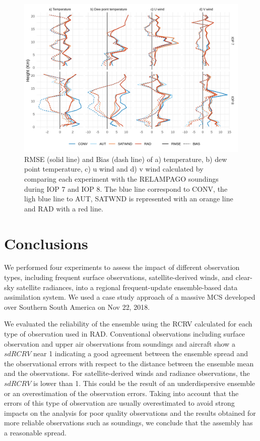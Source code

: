 \documentclass[final,5p,times,twocolumn,authoryear]{elsarticle} %
\begin{document}
\begin{figure}[t]

{\centering \includegraphics{../figures/soundings-1} 

}

\caption{RMSE (solid line) and Bias (dash line) of a) temperature, b) dew point temperature, c) u wind and d) v wind calculated by comparing each experiment with the RELAMPAGO soundings during IOP 7 and IOP 8. The blue line correspond to CONV, the ligh blue line to AUT, SATWND is represented with an orange line and RAD with a red line.}\label{fig:soundings}
\end{figure}

\hypertarget{conclusions}{%
\section{Conclusions}\label{conclusions}}

We performed four experiments to assess the impact of different observation types, including frequent surface observations, satellite-derived winds, and clear-sky satellite radiances, into a regional frequent-update ensemble-based data assimilation system. We used a case study approach of a massive MCS developed over Southern South America on Nov 22, 2018.

We evaluated the reliability of the ensemble using the RCRV calculated for each type of observation used in RAD. Conventional observations including surface observation and upper air observations from soundings and aircraft show a \(sd RCRV\) near 1 indicating a good agreement between the ensemble spread and the observational errors with respect to the distance between the ensemble mean and the observations. For satellite-derived winds and radiance observations, the \(sd RCRV\) is lower than 1. This could be the result of an underdispersive ensemble or an overestimation of the observation errors. Taking into account that the errors of this type of observation are usually overestimated to avoid strong impacts on the analysis for poor quality observations and the results obtained for more reliable observations such as soundings, we conclude that the assembly has a reasonable spread.
\end{document}
